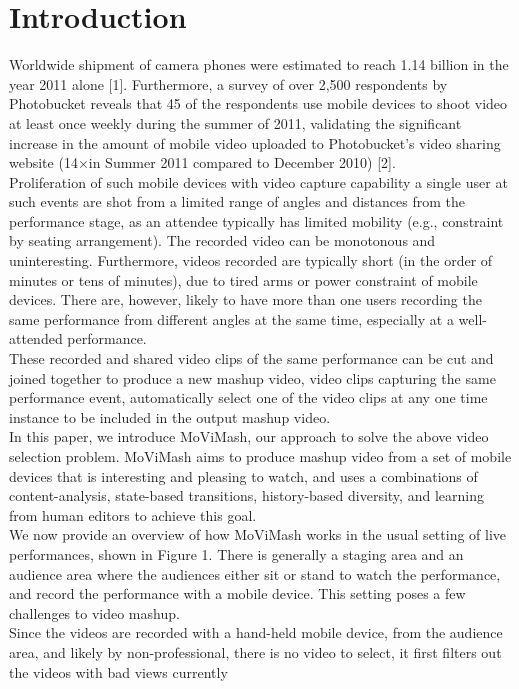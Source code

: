 \documentclass{sig-alternate}
\begin{document}
{{{\section{Introduction}
Worldwide shipment of camera phones were estimated to reach
1.14 billion in the year 2011 alone [1]. Furthermore, a survey of
over 2,500 respondents by Photobucket reveals that 45  of the respondents
use mobile devices to shoot video at least once weekly during the summer of 2011, validating the significant increase in
the amount of mobile video uploaded to Photobucket’s video sharing
website (14×in Summer 2011 compared to December 2010) [2].\\
Proliferation of such mobile devices with video capture capability
a single user at such events are shot from a limited range of angles
and distances from the performance stage, as an attendee typically
has limited mobility (e.g., constraint by seating arrangement).
The recorded video can be monotonous and uninteresting. Furthermore,
videos recorded are typically short (in the order of minutes
or tens of minutes), due to tired arms or power constraint of mobile
devices. There are, however, likely to have more than one users
recording the same performance from different angles at the same
time, especially at a well-attended performance.\\
These recorded and shared video clips of the same performance
can be cut and joined together to produce a new mashup video,
video clips capturing the same performance event, automatically
select one of the video clips at any one time instance to be included
in the output mashup video.\\
In this paper, we introduce MoViMash, our approach to solve
the above video selection problem. MoViMash aims to produce
mashup video from a set of mobile devices that is interesting and
pleasing to watch, and uses a combinations of content-analysis,
state-based transitions, history-based diversity, and learning from
human editors to achieve this goal.\\
We now provide an overview of how MoViMash works in the
usual setting of live performances, shown in Figure 1. There is
generally a staging area and an audience area where the audiences
either sit or stand to watch the performance, and record the performance
with a mobile device. This setting poses a few challenges to
video mashup.\\
Since the videos are recorded with a hand-held mobile device,
from the audience area, and likely by non-professional, there is no
video to select, it first filters out the videos with bad views currently
}}}
\end{document}
